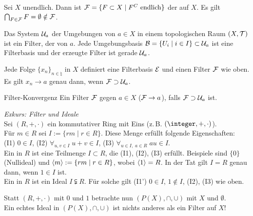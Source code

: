 \begin{Bsp}
    Sei $X$ unendlich.
    Dann ist $\mathcal{F} = \{F \subset X \;|\; F^C \text{ endlich}\}$ der
     auf $X$.
    Es gilt $\bigcap_{F \in \mathcal{F}} F = \emptyset \notin \mathcal{F}$.
\end{Bsp}

\begin{Bsp}
    Das System $\mathcal{U}_a$ der Umgebungen von $a \in X$ in einem topologischen Raum
    $(X, \mathcal{T})$ ist ein Filter, der  von $a$.
    Jede Umgebungsbasis $\mathcal{B} = \{U_i \;|\; i \in I\} \subset \mathcal{U}_a$ ist
    eine Filterbasis und der erzeugte Filter ist gerade $\mathcal{U}_a$.
\end{Bsp}

\begin{Bsp}
    Jede Folge $\{x_n\}_{n \in \natural}$ in $X$ definiert eine Filterbasis
    $\mathcal{E}$ und einen Filter $\mathcal{F}$ wie oben. \\
    Es gilt $x_n \to a$ genau dann, wenn $\mathcal{F} \supset \mathcal{U}_a$.
\end{Bsp}

\begin{Def}{Filter-Konvergenz}
    Ein Filter $\mathcal{F}$  gegen $a \in X$ ($\mathcal{F} \to a$), falls
    $\mathcal{F} \supset \mathcal{U}_a$ ist.
\end{Def}

\linie

\emph{Exkurs: Filter und Ideale} \\
Sei $(R, +, \cdot)$ ein kommutativer Ring mit Eins
(z.\,B. $(\integer, +, \cdot)$). \\
Für $m \in R$ sei
$I := \{rm \;|\; r \in R\}$. Diese Menge erfüllt folgende
Eigenschaften: \\
(I1) $0 \in I$, \quad
(I2) $\forall_{u, v \in I}\; u + v \in I$, \quad
(I3) $\forall_{u \in I,\; a \in R}\; au \in I$. \\
Ein  in $R$ ist eine Teilmenge $I \subset R$,
die (I1), (I2), (I3) erfüllt.
Beispiele sind $\{0\}$ (Nullideal) und $\left\langle{m}\right\rangle := \{rm \;|\; r \in R\}$,
wobei $\left\langle{1}\right\rangle = R$.
In der Tat gilt $I = R$ genau dann, wenn $1 \in I$ ist. \\
Ein  in $R$ ist ein Ideal $I \subsetneqq R$.
Für solche gilt (I1') $0 \in I$, $1 \notin I$, (I2), (I3) wie oben.

Statt $(R, +, \cdot)$ mit $0$ und $1$ betrachte nun $(P(X), \cap, \cup)$ mit
$X$ und $\emptyset$. \\
Ein echtes Ideal in $(P(X), \cap, \cup)$ ist nichts anderes als ein
Filter auf $X$!

